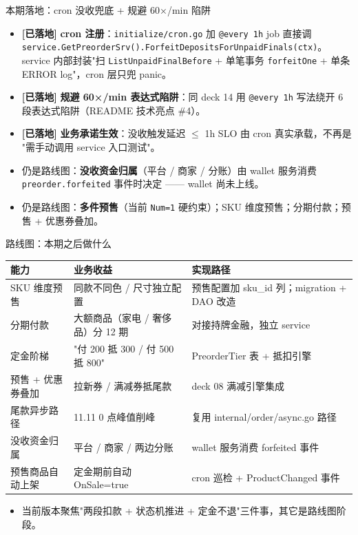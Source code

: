 \documentclass[aspectratio=169,11pt]{beamer}
\begin{document}
\begin{frame}[shrink]{本期落地：cron 没收兜底 + 规避 60×/min 陷阱}
\begin{itemize}\small
  \item \textcolor{cOK}{\textbf{[已落地]}} \textbf{cron 注册}：\texttt{initialize/cron.go} 加 \texttt{@every 1h} job 直接调 \texttt{service.GetPreorderSrv().ForfeitDepositsForUnpaidFinals(ctx)}。service 内部封装"扫 \texttt{ListUnpaidFinalBefore} + 单笔事务 \texttt{forfeitOne} + 单条 ERROR log"，cron 层只兜 panic。
  \item \textcolor{cOK}{\textbf{[已落地]}} \textbf{规避 60×/min 表达式陷阱}：同 deck 14 用 \texttt{@every 1h} 写法绕开 6 段表达式陷阱（README 技术亮点 \#4）。
  \item \textcolor{cOK}{\textbf{[已落地]}} \textbf{业务承诺生效}：没收触发延迟 $\leq$ 1h SLO 由 cron 真实承载，不再是 "需手动调用 service 入口测试"。
  \item 仍是路线图：\textbf{没收资金归属}（平台 / 商家 / 分账）由 wallet 服务消费 \texttt{preorder.forfeited} 事件时决定 —— wallet 尚未上线。
  \item 仍是路线图：\textbf{多件预售}（当前 \texttt{Num=1} 硬约束）；SKU 维度预售；分期付款；预售 + 优惠券叠加。
\end{itemize}
\end{frame}

\begin{frame}[shrink]{路线图：本期之后做什么}
{\footnotesize
\begin{tabular}{@{}p{4cm}p{4cm}p{4cm}@{}}
\toprule
能力 & 业务收益 & 实现路径 \\
\midrule
SKU 维度预售 & 同款不同色 / 尺寸独立配置 & 预售配置加 sku\_id 列；migration + DAO 改造 \\
分期付款 & 大额商品（家电 / 奢侈品）分 12 期 & 对接持牌金融，独立 service \\
定金阶梯 & "付 200 抵 300 / 付 500 抵 800" & PreorderTier 表 + 抵扣引擎 \\
预售 + 优惠券叠加 & 拉新券 / 满减券抵尾款 & deck 08 满减引擎集成 \\
尾款异步路径 & 11.11 0 点峰值削峰 & 复用 internal/order/async.go 路径 \\
没收资金归属 & 平台 / 商家 / 两边分账 & wallet 服务消费 forfeited 事件 \\
预售商品自动上架 & 定金期前自动 OnSale=true & cron 巡检 + ProductChanged 事件 \\
\bottomrule
\end{tabular}}
\vspace{1mm}
\begin{itemize}\small
  \item 当前版本聚焦"两段扣款 + 状态机推进 + 定金不退"三件事，其它是路线图阶段。
\end{itemize}
\end{frame}
\end{document}
